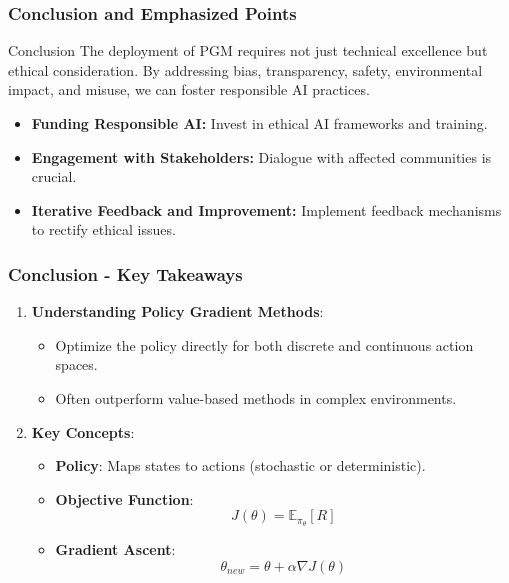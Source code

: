 \documentclass[aspectratio=169]{beamer}
\begin{document}
\begin{frame}[fragile]
    \frametitle{Conclusion and Emphasized Points}
    \begin{block}{Conclusion}
        The deployment of PGM requires not just technical excellence but ethical consideration. By addressing bias, transparency, safety, environmental impact, and misuse, we can foster responsible AI practices.
    \end{block}
    
    \begin{itemize}
        \item \textbf{Funding Responsible AI:} Invest in ethical AI frameworks and training.
        \item \textbf{Engagement with Stakeholders:} Dialogue with affected communities is crucial.
        \item \textbf{Iterative Feedback and Improvement:} Implement feedback mechanisms to rectify ethical issues.
    \end{itemize}
\end{frame}

\begin{frame}[fragile]
    \frametitle{Conclusion - Key Takeaways}
    \begin{enumerate}
        \item \textbf{Understanding Policy Gradient Methods}:
        \begin{itemize}
            \item Optimize the policy directly for both discrete and continuous action spaces.
            \item Often outperform value-based methods in complex environments.
        \end{itemize}

        \item \textbf{Key Concepts}:
        \begin{itemize}
            \item \textbf{Policy}: Maps states to actions (stochastic or deterministic).
            \item \textbf{Objective Function}:
            \[
            J(\theta) = \mathbb{E}_{\pi_\theta}[R]
            \]
            \item \textbf{Gradient Ascent}:
            \[
            \theta_{new} = \theta + \alpha \nabla J(\theta)
            \]
        \end{itemize}
    \end{enumerate}
\end{frame}
\end{document}
